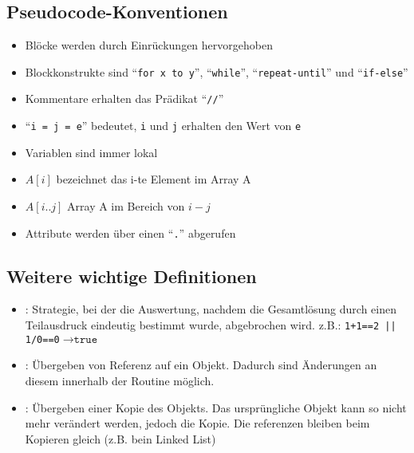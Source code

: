 \documentclass[
    ngerman,
    color=3b,
    dark_mode,
    load_common, %
    summary,
    boxarc,
]{tuda_summary}
\begin{document}
\subsection{Pseudocode-Konventionen}
\begin{itemize}
    \item Blöcke werden durch Einrückungen hervorgehoben
    \item Blockkonstrukte sind "`\texttt{for x to y}"', "`\texttt{while}"', "`\texttt{repeat-until}"' und "`\texttt{if-else}"'
    \item Kommentare erhalten das Prädikat "`\texttt{//}"'
    \item "`\texttt{i = j = e}"' bedeutet, \texttt{i} und \texttt{j} erhalten den Wert von \texttt{e}
    \item Variablen sind immer lokal
    \item $A[i]$ bezeichnet das i-te Element im Array A
    \item $A[i..j]$ Array A im Bereich von $i-j$
    \item Attribute werden über einen "`\texttt{.}"' abgerufen
\end{itemize}
\subsection{Weitere wichtige Definitionen}
\begin{itemize}
    \item {}: Strategie, bei der die Auswertung, nachdem die Gesamtlösung durch einen Teilausdruck eindeutig bestimmt wurde, abgebrochen wird. 
    z.B.: \texttt{1+1==2 || 1/0==0}$\longrightarrow \texttt{true}$
    \item {}: Übergeben von Referenz auf ein Objekt. Dadurch sind Änderungen an diesem innerhalb der Routine möglich.
    \item {}: Übergeben einer Kopie des Objekts. Das ursprüngliche Objekt kann so nicht mehr verändert werden, jedoch die Kopie. Die referenzen bleiben beim Kopieren gleich (z.B. bein Linked List)
\end{itemize}
\clearpage
\end{document}
